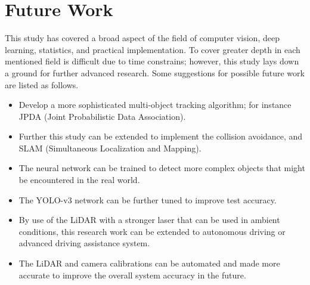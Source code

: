 \newpage
\section{Future Work}
This study has covered a broad aspect of the field of computer vision, deep learning, statistics, and practical implementation. To cover greater depth in each mentioned field is difficult due to time constrains; however, this study lays down a ground for further advanced research. Some suggestions for possible future work are listed as follows. 

\begin{itemize}
    \item Develop a more sophisticated multi-object tracking algorithm; for instance JPDA (Joint Probabilistic Data Association). 
    \item Further this study can be extended to implement the collision avoidance, and SLAM (Simultaneous Localization and Mapping).
    \item The neural network can be trained to detect more complex objects that might be encountered in the real world.
    \item The YOLO-v3 network can be further tuned to improve test accuracy.
    \item By use of the LiDAR with a stronger laser that can be used in ambient conditions, this research work can be extended to autonomous driving or advanced driving assistance system.
    \item The LiDAR and camera calibrations can be automated and made more accurate to improve the overall system accuracy in the future. 
\end{itemize}
 



